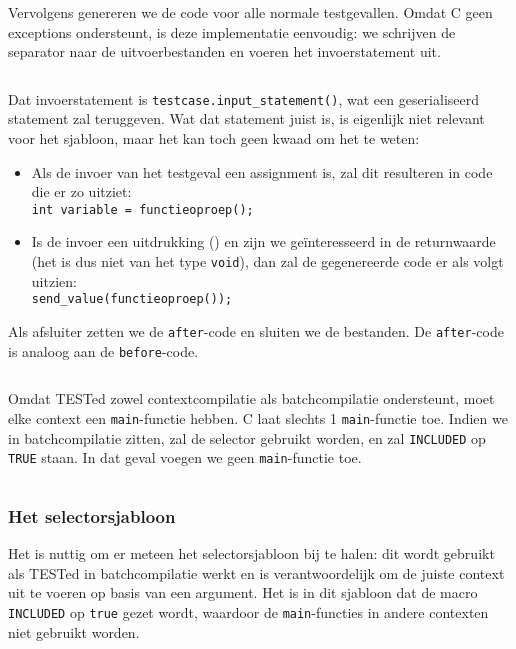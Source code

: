 \inputminted[firstline=38,lastline=49]{mako}{sources/c-context.mako}

Vervolgens genereren we de code voor alle normale testgevallen.
Omdat C geen exceptions ondersteunt, is deze implementatie eenvoudig: we schrijven de separator naar de uitvoerbestanden en voeren het invoerstatement uit.

\inputminted[firstline=52,lastline=56]{mako}{sources/c-context.mako}

Dat invoerstatement is \texttt{testcase.input\_statement()}, wat een geserialiseerd statement zal teruggeven.
Wat dat statement juist is, is eigenlijk niet relevant voor het sjabloon, maar het kan toch geen kwaad om het te weten:

\begin{itemize}
    \item Als de invoer van het testgeval een assignment is, zal dit resulteren in code die er zo uitziet: \\
    \texttt{int variable = functieoproep();}
    
    \item Is de invoer een uitdrukking () en zijn we geïnteresseerd in de returnwaarde (het is dus niet van het type \texttt{void}), dan zal de gegenereerde code er als volgt uitzien: \\
    \texttt{send_value(functieoproep());}
\end{itemize}

Als afsluiter zetten we de \texttt{after}-code en sluiten we de bestanden.
De \texttt{after}-code is analoog aan de \texttt{before}-code.

\inputminted[firstline=58,lastline=63]{mako}{sources/c-context.mako}

Omdat TESTed zowel contextcompilatie als batchcompilatie ondersteunt, moet elke context een \texttt{main}-functie hebben.
C laat slechts 1 \texttt{main}-functie toe.
Indien we in batchcompilatie zitten, zal de selector gebruikt worden, en zal \texttt{INCLUDED} op \texttt{TRUE} staan.
In dat geval voegen we geen \texttt{main}-functie toe.

\inputminted[firstline=65,lastline=69]{mako}{sources/c-context.mako}

\subsubsection{Het selectorsjabloon}

Het is nuttig om er meteen het selectorsjabloon bij te halen: dit wordt gebruikt als TESTed in batchcompilatie werkt en is verantwoordelijk om de juiste context uit te voeren op basis van een argument.
Het is in dit sjabloon dat de macro \texttt{INCLUDED} op \texttt{true} gezet wordt, waardoor de \texttt{main}-functies in andere contexten niet gebruikt worden.

